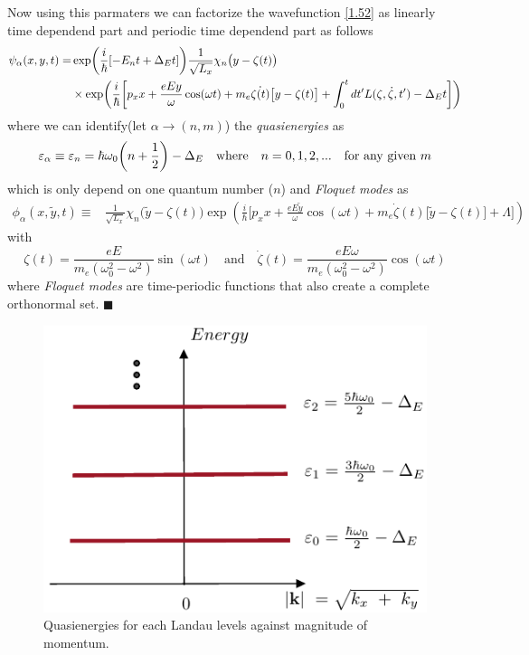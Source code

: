 \noindent
Now using this parmaters we can factorize the wavefunction \eqref{1.52} as linearly time dependend part and periodic time dependend part as follows
\begin{equation} \label{3.13}
  \begin{aligned}
    \psi_{\alpha}(x,y,t)  = &
    \exp(\frac{i}{\hbar}\qty[-E_nt + \Delta_E t ])
    \frac{1}{\sqrt{L_x}} \chi_n\big(y - \zeta(t)\big)
    \\
    & \times
    \exp(
     \frac{i}{\hbar}\bigg[
     p_x x +
     \frac{eEy}{\omega}\cos(\omega t)+
     m_e\dot{\zeta(t)}\big[y-\zeta(t)\big]
     + \int_0^{t}dt'L(\zeta,\dot{\zeta},t') - \Delta_E t  \bigg])
  \end{aligned}
\end{equation}
where we can identify(let $\alpha \rightarrow (n,m)$) the \textit{quasienergies} as
\begin{equation} \label{3.14}
  \varepsilon_{\alpha} \equiv
  \varepsilon_{n} =
  \hbar \omega_0\qty(n + \frac{1}{2}) - \Delta_E \quad \text{where} \quad
  n = 0,1,2, ... \quad \text{for any given } m
\end{equation}
which is only depend on one quantum number ($n$) and \textit{Floquet modes} as
\begin{equation} \label{3.15}
  \begin{aligned}
    \phi_{\alpha}(x,\tilde{y},t) \equiv &
    \frac{1}{\sqrt{L_x}} \chi_{n}\big(\tilde{y} - \zeta(t)\big)
    \exp(
     \frac{i}{\hbar}\bigg[
     p_x x +
     \frac{eE\tilde{y}}{\omega}\cos(\omega t)+
     m_e\dot{\zeta}(t)\big[\tilde{y}-\zeta(t)\big]
     + \Lambda \bigg])
  \end{aligned}
\end{equation}
with
\begin{equation} \label{3.16}
  \zeta(t) = \frac{eE}{m_e(\omega_0^2 - \omega^2)}\sin(\omega t) \quad \text{and} \quad
  \dot{\zeta}(t) = \frac{eE\omega}{m_e(\omega_0^2 - \omega^2)}\cos(\omega t)
\end{equation}
where  \textit{Floquet modes} are time-periodic functions that also create a complete orthonormal set.
\hfill$\blacksquare$
\begin{figure}[ht!]
  \centering
  \includegraphics[scale=0.9]{figures/fig03.pdf}
  \caption{Quasienergies for each Landau levels against magnitude of momentum.}
  \label{fig:3.0}
\end{figure}

